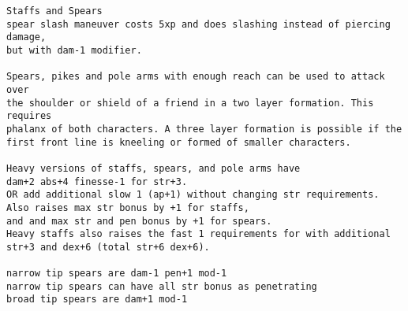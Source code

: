 \goodbreak \small \begin{samepage} \begin{verbatim}
Staffs and Spears
spear slash maneuver costs 5xp and does slashing instead of piercing damage,
but with dam-1 modifier.

Spears, pikes and pole arms with enough reach can be used to attack over
the shoulder or shield of a friend in a two layer formation. This requires
phalanx of both characters. A three layer formation is possible if the
first front line is kneeling or formed of smaller characters.

Heavy versions of staffs, spears, and pole arms have
dam+2 abs+4 finesse-1 for str+3.
OR add additional slow 1 (ap+1) without changing str requirements.
Also raises max str bonus by +1 for staffs,
and and max str and pen bonus by +1 for spears.
Heavy staffs also raises the fast 1 requirements for with additional
str+3 and dex+6 (total str+6 dex+6).

narrow tip spears are dam-1 pen+1 mod-1
narrow tip spears can have all str bonus as penetrating
broad tip spears are dam+1 mod-1


\end{verbatim}
\end{samepage}
